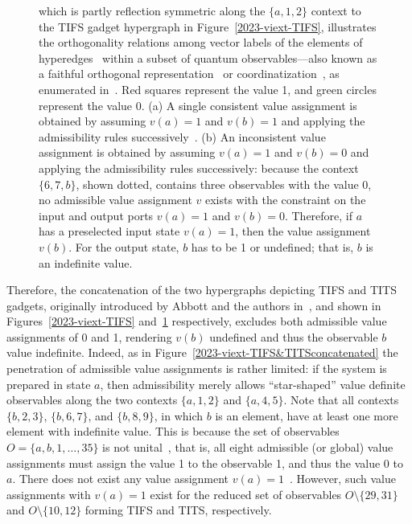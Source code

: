 \documentclass[%
 superscriptaddress,
  preprint,
 showpacs,
 showkeys,
 nofootinbib,
  amsmath,amssymb,
  aps,
 pra,
  longbibliography,
  floatfix,
 ]{revtex4-2}
\theoremstyle{definition}
\begin{document}
\begin{figure}
{which is partly reflection symmetric along the $\{a,1,2\}$ context to the TIFS gadget hypergraph in Figure~\ref{2023-viext-TIFS},
illustrates the orthogonality relations among vector labels of the elements of hyperedges~\cite{lovasz-79}
within a subset of quantum observables---also known as a faithful orthogonal representation~\cite{Portillo-2015} or coordinatization~\cite{Pavii2018},
as enumerated in~\cite[Table~I]{2018-minimalYIYS}. Red squares represent the value 1, and green circles represent the value 0.
(a) A single consistent value assignment is obtained by assuming $v(a)=1$ and $v(b)=1$ and applying the admissibility rules successively~\cite[Figure~(24.2.b)]{Svozil-2018-p}.
(b) An inconsistent value assignment is obtained by assuming $v(a)=1$ and $v(b)=0$ and applying the admissibility rules successively:
because the context $\{6,7,b\}$, shown dotted, contains three observables with the value 0,
no admissible value assignment $v$ exists with the constraint on the input and output ports $v(a)=1$ and $v(b)=0$.
Therefore, if $a$ has a preselected input state $v(a)=1$, then the value assignment $v(b)$.
For the output state, $b$ has to be 1 or undefined; that is, $b$ is an indefinite value.
}
                \label{2023-viext-TITS}
        \end{figure}





Therefore, the concatenation of the two hypergraphs depicting TIFS and TITS gadgets,
originally introduced by Abbott and the authors in~\cite{2018-minimalYIYS}, and
shown in Figures~\ref{2023-viext-TIFS} and~\ref{2023-viext-TITS} respectively, excludes both admissible value assignments of 0 and 1,
rendering $v(b)$ undefined and thus the observable $b$ value indefinite.
Indeed, as in Figure~\ref{2023-viext-TIFS&TITSconcatenated}
the penetration of admissible value assignments is rather limited: if the system is prepared in state $a$, then admissibility merely allows
``star-shaped'' value definite observables along the two contexts $\{a,1,2\}$ and $\{a,4,5\}$.
Note that all contexts
$\{b,2,3\}$,
$\{b,6,7\}$, and
$\{b,8,9\}$,
in which $b$ is an element, have at least one more element with indefinite value.
This is because
the set of observables $O=\{ a,b, 1,\ldots , 35\}$ is not unital~\cite{svozil-tkadlec}, that is, all eight admissible (or global) value assignments must assign the value 1 to the observable 1,
and thus the value 0 to $a$.
There does not exist any value assignment  $v(a)=1$~\cite[Table~24.1]{Svozil-2018-p}.
However, such value assignments with  $v(a)=1$ exist for the reduced set of observables
$O  \setminus \{29,31\}$
and
$O  \setminus \{10,12\}$
forming TIFS and TITS, respectively.
\end{document}
